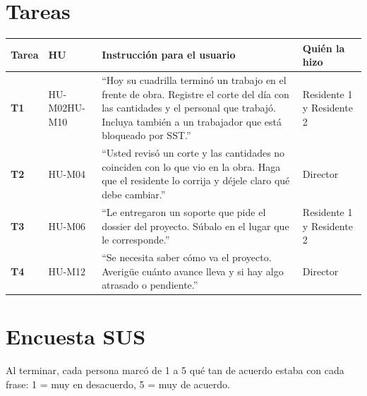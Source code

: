 \documentclass[11pt]{article}
\begin{document}
\section{Tareas}

\begin{longtable}{>{\raggedright\arraybackslash}p{1.15cm} >{\raggedright\arraybackslash}p{1.7cm} >{\raggedright\arraybackslash}p{9.35cm} >{\raggedright\arraybackslash}p{2.1cm}}
\toprule
\textbf{Tarea} & \textbf{HU} & \textbf{Instrucción para el usuario} & \textbf{Quién la hizo} \\
\midrule
\endhead
\bottomrule
\endfoot
\textbf{T1} &
\mbox{HU-M02}\newline \mbox{HU-M10} &
``Hoy su cuadrilla terminó un trabajo en el frente de obra. Registre el corte del día
con las cantidades y el personal que trabajó. Incluya también a un trabajador que
está bloqueado por SST.'' &
Residente 1 y Residente 2 \\

\textbf{T2} &
\mbox{HU-M04} &
``Usted revisó un corte y las cantidades no coinciden con lo que
vio en la obra. Haga que el residente lo corrija y déjele claro qué debe cambiar.'' &
Director \\

\textbf{T3} &
\mbox{HU-M06} &
``Le entregaron un soporte que pide el dossier del proyecto. Súbalo en
el lugar que le corresponde.'' &
Residente 1 y Residente 2 \\

\textbf{T4} &
\mbox{HU-M12} &
``Se necesita saber cómo va el proyecto. Averigüe cuánto avance lleva y si hay algo
atrasado o pendiente.'' &
Director \\
\end{longtable}

\section{Encuesta SUS}\label{sec:sus}

Al terminar, cada persona marcó de 1 a 5 qué tan de acuerdo estaba con cada frase:
1 = muy en desacuerdo, 5 = muy de acuerdo.
\end{document}
